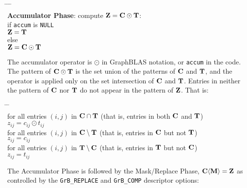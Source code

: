 \documentclass[12pt]{article}
\begin{document}
    {\small
    \begin{tabbing}
    \hspace{2em} \= \hspace{2em} \= \hspace{2em} \= \hspace{2em} \= \\
    \> {\bf Accumulator Phase}: compute ${\bf Z = C \odot T}$: \\
    \> \> if \verb'accum' is \verb'NULL' \\
    \> \>\>    ${\bf Z = T}$ \\
    \> \> else \\
    \> \>\>    ${\bf Z = C \odot T}$
    \end{tabbing}}
The accumulator operator is $\odot$ in GraphBLAS notation, or \verb'accum'
in the code.  The pattern of ${\bf C \odot T}$ is the set union of the
patterns of ${\bf C}$ and ${\bf T}$, and the operator is applied only on the
set intersection of ${\bf C}$ and ${\bf T}$.  Entries in neither the pattern
of ${\bf C}$ nor ${\bf T}$ do not appear in the pattern of ${\bf Z}$.  That is:
    \vspace{-0.2in}
    {\small
    \begin{tabbing}
    \hspace{2em} \= \hspace{2em} \= \hspace{2em} \= \\
    \> for all entries $(i,j)$ in ${\bf C \cap T}$
    (that is, entries in both ${\bf C}$ and ${\bf T}$) \\
    \> \> $z_{ij} = c_{ij} \odot t_{ij}$ \\
    \> for all entries $(i,j)$ in ${\bf C \setminus T}$
    (that is, entries in ${\bf C}$ but not ${\bf T}$) \\
    \> \> $z_{ij} = c_{ij}$ \\
    \> for all entries $(i,j)$ in ${\bf T \setminus C}$
    (that is, entries in ${\bf T}$ but not ${\bf C}$) \\
    \> \> $z_{ij} = t_{ij}$
    \end{tabbing} }
The Accumulator Phase is followed by the Mask/Replace Phase,
${\bf C \langle M \rangle = Z}$
as controlled by the \verb'GrB_REPLACE' and \verb'GrB_COMP' descriptor options:
    \vspace{-0.2in}
\end{document}
